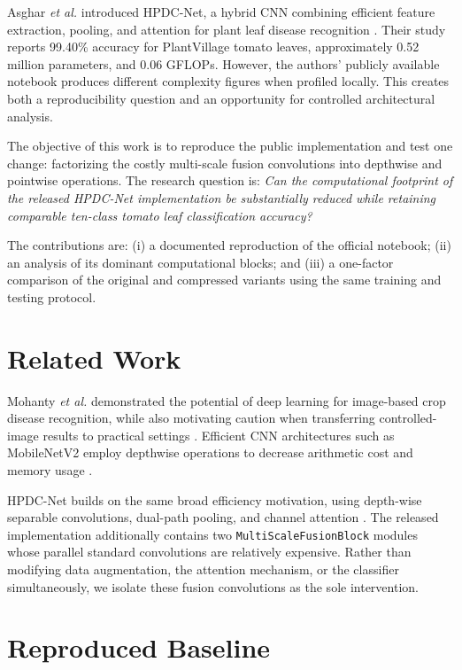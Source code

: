 \documentclass[conference,10pt]{IEEEtran}
\begin{document}
Asghar \emph{et al.} introduced HPDC-Net, a hybrid CNN combining efficient feature extraction, pooling, and attention for plant leaf disease recognition \cite{asghar2025}. Their study reports 99.40\% accuracy for PlantVillage tomato leaves, approximately 0.52 million parameters, and 0.06 GFLOPs. However, the authors' publicly available notebook \cite{hpdcgithub} produces different complexity figures when profiled locally. This creates both a reproducibility question and an opportunity for controlled architectural analysis.

The objective of this work is to reproduce the public implementation and test one change: factorizing the costly multi-scale fusion convolutions into depthwise and pointwise operations. The research question is: \emph{Can the computational footprint of the released HPDC-Net implementation be substantially reduced while retaining comparable ten-class tomato leaf classification accuracy?}

The contributions are: (i) a documented reproduction of the official notebook; (ii) an analysis of its dominant computational blocks; and (iii) a one-factor comparison of the original and compressed variants using the same training and testing protocol.

\section{Related Work}
Mohanty \emph{et al.} demonstrated the potential of deep learning for image-based crop disease recognition, while also motivating caution when transferring controlled-image results to practical settings \cite{mohanty2016}. Efficient CNN architectures such as MobileNetV2 employ depthwise operations to decrease arithmetic cost and memory usage \cite{sandler2018}.

HPDC-Net builds on the same broad efficiency motivation, using depth-wise separable convolutions, dual-path pooling, and channel attention \cite{asghar2025}. The released implementation additionally contains two \texttt{MultiScaleFusionBlock} modules whose parallel standard convolutions are relatively expensive. Rather than modifying data augmentation, the attention mechanism, or the classifier simultaneously, we isolate these fusion convolutions as the sole intervention.

\section{Reproduced Baseline}
\end{document}
